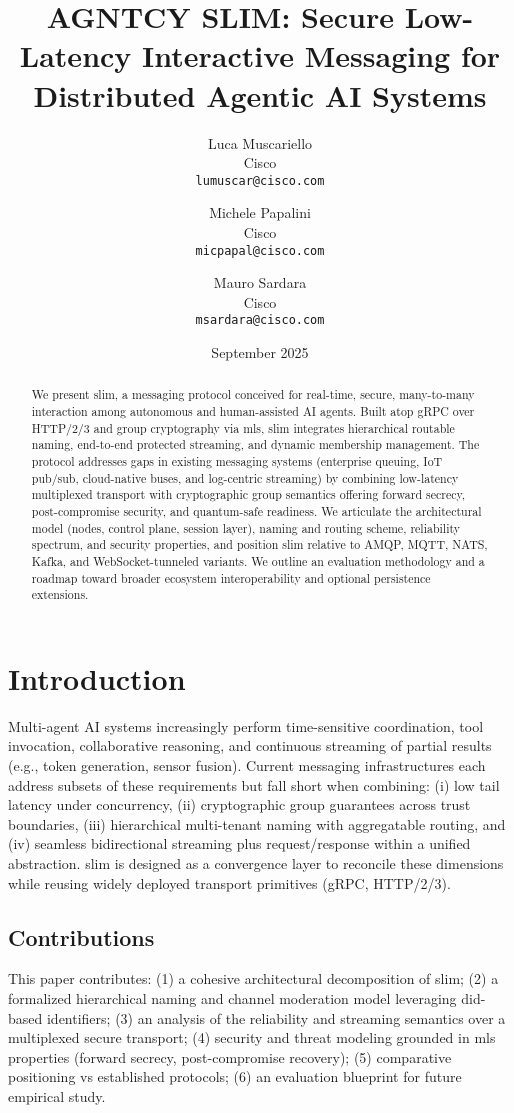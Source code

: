 \documentclass{article}
\title{AGNTCY SLIM: Secure Low-Latency Interactive Messaging for Distributed Agentic AI Systems}
\author{Luca Muscariello \\ Cisco \\ \texttt{lumuscar@cisco.com}
  \and Michele Papalini \\ Cisco \\ \texttt{micpapal@cisco.com}
  \and Mauro Sardara \\ Cisco \\ \texttt{msardara@cisco.com}}
\date{September 2025}
\newcommand{\HTTP}{HTTP/2\slash3}
\theoremstyle{definition}
\theoremstyle{remark}
\begin{document}
\maketitle
\begin{abstract}
We present \gls{slim}, a messaging protocol conceived for real-time, secure, many-to-many interaction among autonomous and human-assisted AI agents. Built atop gRPC over \HTTP{} and group cryptography via \gls{mls}, \gls{slim} integrates hierarchical routable naming, end-to-end protected streaming, and dynamic membership management. The protocol addresses gaps in existing messaging systems (enterprise queuing, IoT pub/sub, cloud-native buses, and log-centric streaming) by combining low-latency multiplexed transport with cryptographic group semantics offering forward secrecy, post-compromise security, and quantum-safe readiness. We articulate the architectural model (nodes, control plane, session layer), naming and routing scheme, reliability spectrum, and security properties, and position \gls{slim} relative to AMQP, MQTT, NATS, Kafka, and WebSocket-tunneled variants. We outline an evaluation methodology and a roadmap toward broader ecosystem interoperability and optional persistence extensions.
\end{abstract}


\section{Introduction}\label{sec:intro}
Multi-agent AI systems increasingly perform time-sensitive coordination, tool invocation, collaborative reasoning, and continuous streaming of partial results (e.g., token generation, sensor fusion). Current messaging infrastructures each address subsets of these requirements but fall short when combining: (i) low tail latency under concurrency, (ii) cryptographic group guarantees across trust boundaries, (iii) hierarchical multi-tenant naming with aggregatable routing, and (iv) seamless bidirectional streaming plus request/response within a unified abstraction. \gls{slim} is designed as a convergence layer to reconcile these dimensions while reusing widely deployed transport primitives (gRPC, \HTTP{}).

\subsection{Contributions}
This paper contributes: (1) a cohesive architectural decomposition of \gls{slim}; (2) a formalized hierarchical naming and channel moderation model leveraging \gls{did}-based identifiers; (3) an analysis of the reliability and streaming semantics over a multiplexed secure transport; (4) security and threat modeling grounded in \gls{mls} properties (forward secrecy, post-compromise recovery); (5) comparative positioning vs established protocols; (6) an evaluation blueprint for future empirical study.
\end{document}
